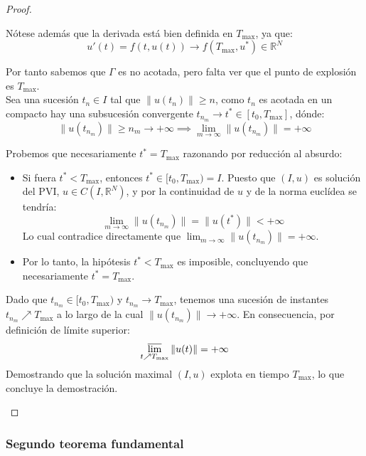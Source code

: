 \begin{proof}
\begin{enumerate}
        Nótese además que la derivada está bien definida en $T_{\text{max}}$, ya que:
        \[
            u'(t) = f(t, u(t)) \to f(T_{\text{max}}, u^*) \in \mathbb{R}^N
        \]

        Por tanto sabemos que $\Gamma$ es no acotada, pero falta ver que el punto de explosión es $T_{\text{max}}$.\\

        Sea una sucesión $t_n \in I$ tal que $\| u(t_n) \| \geq n$, como $t_n$ es acotada en un compacto hay una subsucesión convergente $t_{n_m} \to t^* \in [t_0, T_{\text{max}}]$, dónde:
        \[
            \| u(t_{n_m}) \| \geq n_m \to +\infty \implies
            \lim_{m \to \infty} \| u(t_{n_m}) \| = +\infty
        \]

        Probemos que necesariamente $t^* = T_{\text{max}}$ razonando por reducción al absurdo:
        \begin{itemize}
            \item Si fuera $t^* < T_{\text{max}}$, entonces $t^* \in [t_0, T_{\text{max}}) = I$. Puesto que $(I, u)$ es solución del PVI, $u \in C(I, \mathbb{R}^N)$, y por la continuidad de $u$ y de la norma euclídea se tendría:
            \[
                \lim_{m \to \infty} \| u(t_{n_m}) \| = \| u(t^*) \| < +\infty
            \]
            Lo cual contradice directamente que $\lim_{m \to \infty} \| u(t_{n_m}) \| = +\infty$.
            \item Por lo tanto, la hipótesis $t^* < T_{\text{max}}$ es imposible, concluyendo que necesariamente $t^* = T_{\text{max}}$.
        \end{itemize}

        Dado que $t_{n_m} \in [t_0, T_{\text{max}})$ y $t_{n_m} \to T_{\text{max}}$, tenemos una sucesión de instantes $t_{n_m} \nearrow T_{\text{max}}$ a lo largo de la cual $\| u(t_{n_m}) \| \to +\infty$. En consecuencia, por definición de límite superior:
        \[
            \varlimsup_{t \nearrow T_{\text{max}}} \| u(t) \| = +\infty
        \]
        Demostrando que la solución maximal $(I, u)$ explota en tiempo $T_{\text{max}}$, lo que concluye la demostración.
    \end{enumerate}
\end{proof}

\subsubsection{Segundo teorema fundamental}


